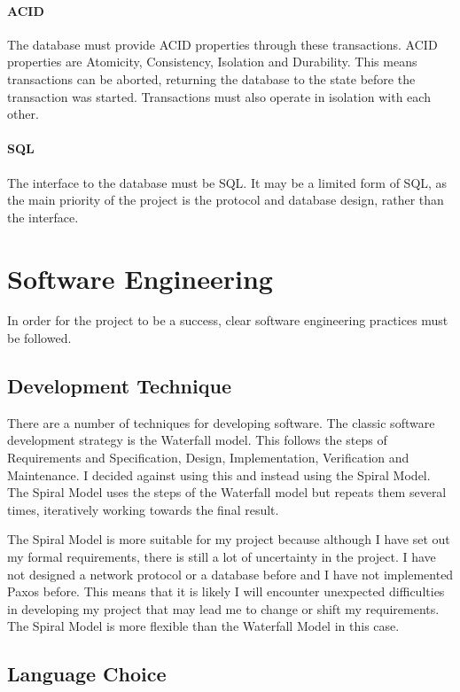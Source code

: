 \documentclass[12pt,twoside,notitlepage]{report}
\begin{document}
\paragraph{ACID} The database must provide ACID properties through these transactions. ACID
properties are Atomicity, Consistency, Isolation and Durability. This means transactions can be
aborted, returning the database to the state before the transaction was started. Transactions must
also operate in isolation with each other.
\paragraph{SQL} The interface to the database must be SQL. It may be a limited form of SQL, as the
main priority of the project is the protocol and database design, rather than the interface.

\section{Software Engineering}

In order for the project to be a success, clear software engineering practices must be followed.

\subsection{Development Technique}

There are a number of techniques for developing software. The classic software development
strategy is the Waterfall model. This follows the steps of Requirements and Specification, Design,
Implementation, Verification and Maintenance. I decided against using this and instead using the
Spiral Model. The Spiral Model uses the steps of the Waterfall model but repeats them several
times, iteratively working towards the final result.

The Spiral Model is more suitable for my project because although I have set out my formal
requirements, there is still a lot of uncertainty in the project. I have not designed a network
protocol or a database before and I have not implemented Paxos before. This means that it is
likely I will encounter unexpected difficulties in developing my project that may lead me to
change or shift my requirements. The Spiral Model is more flexible than the Waterfall Model in
this case.

\subsection{Language Choice}
\end{document}
